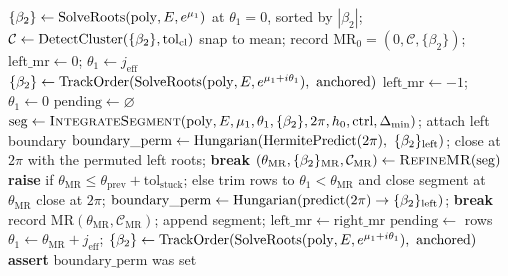\begin{algorithm}
\caption{\textsc{ZeroManager.Run}$(f,E,\mu_1)$ — segment integration, MR refinement, cyclic boundary matching.}
\label{alg:zero-manager-run}
\begin{algorithmic}[1]
\State $\{\beta_2\}\gets\mathrm{SolveRoots}(\mathrm{poly},E,e^{\mu_1})$ at $\theta_1=0$, sorted by $|\beta_2|$; $\mathcal{C}\gets\mathrm{DetectCluster}(\{\beta_2\},\mathrm{tol}_{\mathrm{cl}})$
 
  \State snap to mean; record $\mathrm{MR}_0=(0,\mathcal{C},\{\beta_2\})$; $\mathrm{left\_mr}\gets0$; $\theta_1\gets j_{\mathrm{eff}}$
  \State $\{\beta_2\}\gets\TrackOrder(\SolveRoots(\mathrm{poly},E,e^{\mu_1+i\theta_1}),\ \mathrm{anchored})$
\Else
  \State $\mathrm{left\_mr}\gets-1$; $\theta_1\gets0$
\EndIf
\State $\mathrm{pending}\gets\varnothing$
\Loop
  \State $\mathrm{seg}\gets\textsc{IntegrateSegment}(\mathrm{poly},E,\mu_1,\theta_1,\{\beta_2\},2\pi,h_0,\mathrm{ctrl},\Delta_{\min})$; attach left boundary
    \State $\mathrm{boundary\_perm}\gets\Hungarian(\mathrm{HermitePredict}(2\pi),\ \{\beta_2\}_{\mathrm{left}})$; close at $2\pi$ with the permuted left roots; \textbf{break}
  \Else {}
    \State $(\theta_{\mathrm{MR}},\{\beta_2\}_{\mathrm{MR}},\mathcal{C}_{\mathrm{MR}})\gets\textsc{RefineMR}(\mathrm{seg})$ 
      \State \textbf{raise} if $\theta_{\mathrm{MR}}\le\theta_{\mathrm{prev}}+\mathrm{tol}_{\mathrm{stuck}}$; else trim rows to $\theta_1<\theta_{\mathrm{MR}}$ and close segment at $\theta_{\mathrm{MR}}$ 
       
        \State close at $2\pi$; $\mathrm{boundary\_perm}\gets\mathrm{Hungarian}(\mathrm{predict}(2\pi)\to\{\beta_2\}_{\mathrm{left}})$; \textbf{break}
      \Else
        \State record $\mathrm{MR}(\theta_{\mathrm{MR}},\mathcal{C}_{\mathrm{MR}})$; append segment; $\mathrm{left\_mr}\gets\mathrm{right\_mr}$
      \EndIf
    \Else
      \State $\mathrm{pending}\gets$ rows 
    \EndIf
    \State $\theta_1\gets\theta_{\mathrm{MR}}+j_{\mathrm{eff}}$; $\{\beta_2\}\gets\TrackOrder(\SolveRoots(\mathrm{poly},E,e^{\mu_1+i\theta_1}),\ \mathrm{anchored})$
  \EndIf
\EndLoop
\State \textbf{assert} $\mathrm{boundary\_perm}$ was set 
\end{algorithmic}
\end{algorithm}

